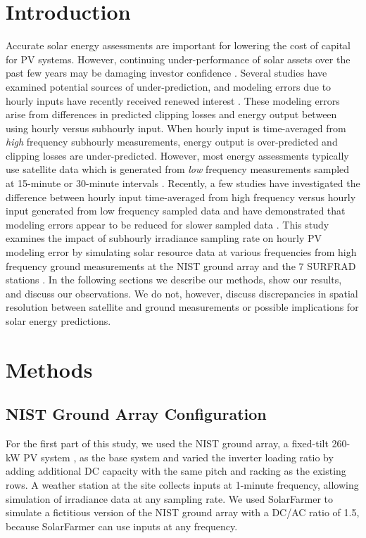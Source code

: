 \documentclass[conference]{IEEEtran}
\begin{document}
\section{Introduction}
Accurate solar energy assessments are important for lowering the cost of capital for PV systems. However, continuing under-performance of solar assets over the past few years may be damaging investor confidence \cite{Matsui2021}. Several studies have examined potential sources of under-prediction, and modeling errors due to hourly inputs have recently received renewed interest \cite{Parikh2021,Anderson2020,Bradford2020,Kharait2020,Cormode2019}. These modeling errors arise from differences in predicted clipping losses and energy output between using hourly versus subhourly input. When hourly input is time-averaged from \emph{high} frequency subhourly measurements, energy output is over-predicted and clipping losses are under-predicted. However, most energy assessments typically use satellite data which is generated from \emph{low} frequency measurements sampled at 15-minute or 30-minute intervals \cite{Wilcox2012,Sengupta2018}. Recently, a few studies have investigated the difference between hourly input time-averaged from high frequency versus hourly input generated from low frequency sampled data and have demonstrated that modeling errors appear to be reduced for slower sampled data \cite{Bowersox2021,osti_1797569}. This study examines the impact of subhourly irradiance sampling rate on hourly PV modeling error by simulating solar resource data at various frequencies from high frequency ground measurements at the NIST ground array \cite{Boyd2017,Boyd2017a,Boyd2017b} and the 7 SURFRAD stations \cite{Augustine2000}. In the following sections we describe our methods, show our results, and discuss our observations. We do not, however, discuss discrepancies in spatial resolution between satellite and ground measurements or possible implications for solar energy predictions.

\section{Methods}

\subsection{NIST Ground Array Configuration}
For the first part of this study, we used the NIST ground array, a fixed-tilt 260-kW PV system \cite{Boyd2017,Boyd2017a,Boyd2017b}, as the base system and varied the inverter loading ratio by adding additional DC capacity with the same pitch and racking as the existing rows. A weather station at the site collects inputs at 1-minute frequency, allowing simulation of irradiance data at any sampling rate. We used SolarFarmer \cite{solarfarmer2018} to simulate a fictitious version of the NIST ground array with a DC/AC ratio of 1.5, because SolarFarmer can use inputs at any frequency.
\end{document}
